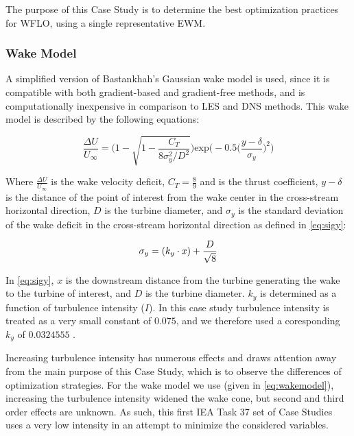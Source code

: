 The purpose of this Case Study is to determine the best optimization practices for WFLO, using a single representative EWM.
    
    \subsubsection{Wake Model} \label{sec:wakemodel}
        A simplified version of Bastankhah's Gaussian wake model \cite{Bastankhah2016, Thomas2018} is used, since it is compatible with both gradient-based and gradient-free methods, and is computationally inexpensive in comparison to LES and DNS methods.
        This wake model is described by the following equations:

        \begin{equation}
            \frac{\Delta U}{U_{\infty}}
            =
            \Bigg(
            1 - \sqrt{
                1 - \frac{C_T}
                {8\sigma_{y}^{2}/D^2}
            }
            \Bigg)
            \text{exp}\bigg(
            -0.5\Big(
                \frac{y-\delta}{\sigma_{y}}
                \Big)^2
            \bigg)
            \label{eq:wakemodel}
        \end{equation}

        \noindent Where $\frac{\Delta U}{U_{\infty}}$ is the wake velocity deficit, $C_T = \frac{8}{9}$ and is the thrust coefficient, $y-\delta$ is the distance of the point of interest from the wake center in the cross-stream horizontal direction, $D$ is the turbine diameter, and $\sigma_y$ is the standard deviation of the wake deficit in the cross-stream horizontal direction as defined in \cref{eq:sigy}:

        \begin{equation}
            \sigma_y = (k_y \cdot x) + \frac{D}{\sqrt{8}} \\
            \label{eq:sigy}
        \end{equation}

        In \cref{eq:sigy}, $x$ is the downstream distance from the turbine generating the wake to the turbine of interest, and $D$ is the turbine diameter. $k_y$ is determined as a function of turbulence intensity ($I$).
        In this case study turbulence intensity is treated as a very small constant of $0.075$, and we therefore used a coresponding $k_{y}$ of $0.0324555$ \cite{Niayifar2016, Thomas2018}.

        Increasing turbulence intensity has numerous effects and draws attention away from the main purpose of this Case Study, which is to observe the differences of optimization strategies.
        For the wake model we use (given in \cref{eq:wakemodel}), increasing the turbulence intensity widened the wake cone, but second and third order effects are unknown.
        As such, this first IEA Task 37 set of Case Studies uses a very low intensity in an attempt to minimize the considered variables.

